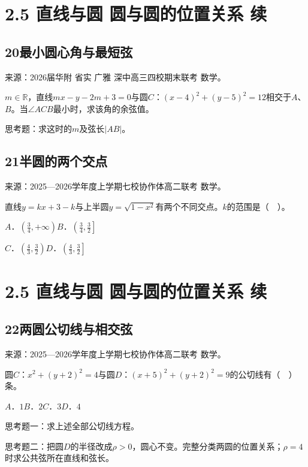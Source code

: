 \documentclass[UTF8,11pt,a4paper,fontset=windows]{ctexart}
\newcommand{\qhead}[2]{\subsection{#1\texorpdfstring{\quad}{ }#2}}
\newcommand{\qsource}[1]{{\footnotesize 来源：#1。\par}}
\begin{document}
\mbox{}

\clearpage

\section{2.5 直线与圆 圆与圆的位置关系 续}

\qhead{20}{最小圆心角与最短弦}
\qsource{2026届华附 省实 广雅 深中高三四校期末联考 数学}
\(m\in \mathbb{R} \)，直线\(mx- y- 2m+ 3= 0\)与圆\(C\)：\(\left(x- 4\right)^{2}+ \left(y- 5\right)^{2}= 12\)相交于\(A\)、\(B\)。当\(\angle ACB\)最小时，求该角的余弦值。\par
思考题：求这时的\(m\)及弦长\(\lvert AB\rvert \)。\par
\vspace{12mm}\vfill

\qhead{21}{半圆的两个交点}
\qsource{2025—2026学年度上学期七校协作体高二联考 数学}
直线\(y= kx+ 3- k\)与上半圆\(y= \sqrt{1- x^{2}}\)有两个不同交点。\(k\)的范围是（　）。\par
\(A\)．\(\left(\frac{3}{4},\allowbreak + \infty \right)\)\qquad \(B\)．\(\left(\frac{3}{4},\allowbreak \frac{3}{2}\right]\)\par
\(C\)．\(\left(\frac{4}{3},\allowbreak \frac{3}{2}\right)\)\qquad \(D\)．\(\left(\frac{4}{3},\allowbreak \frac{3}{2}\right]\)\par
\vspace{12mm}\vfill

\mbox{}

\clearpage

\section{2.5 直线与圆 圆与圆的位置关系 续}

\qhead{22}{两圆公切线与相交弦}
\qsource{2025—2026学年度上学期七校协作体高二联考 数学}
圆\(C\)：\(x^{2}+ \left(y+ 2\right)^{2}= 4\)与圆\(D\)：\(\left(x+ 5\right)^{2}+ \left(y+ 2\right)^{2}= 9\)的公切线有（　）条。\par
\(A\)．\(1\)\qquad \(B\)．\(2\)\qquad \(C\)．\(3\)\qquad \(D\)．\(4\)\par
思考题一：求上述全部公切线方程。\par
思考题二：把圆\(D\)的半径改成\(\rho > 0\)，圆心不变。完整分类两圆的位置关系；\(\rho = 4\)时求公共弦所在直线和弦长。\par
\vspace{12mm}\vfill

\mbox{}

\clearpage
\end{document}
